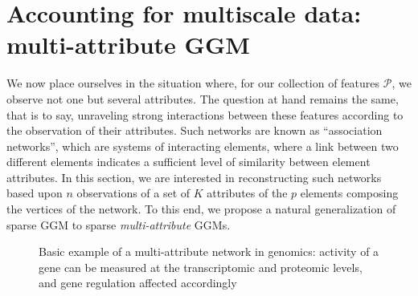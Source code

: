 \section{Accounting for multiscale data: multi-attribute GGM}
\label{sec:multiattribute_ggm}

We now place  ourselves in the situation where, for  our collection of
features $\mathcal{P}$, we observe not one but several attributes. The
question at hand  remains the same, that is to  say, unraveling strong
interactions between  these features  according to the  observation of
their   attributes.   Such   networks  are   known  as   ``association
networks'', which  are systems of  interacting elements, where  a link
between  two  different  elements  indicates  a  sufficient  level  of
similarity  between  element  attributes.   In this  section,  we  are
interested in reconstructing such networks based upon $n$ observations
of a set of $K$ attributes  of the $p$ elements composing the vertices
of the  network. To this end,  we propose a natural  generalization of
sparse GGM to sparse \emph{multi-attribute} GGMs.

\begin{figure}[htbp!]
  \centering
  \caption{Basic example of a multi-attribute network in genomics:
    activity  of a  gene  can  be measured  at  the transcriptomic  and
    proteomic levels, and gene regulation affected accordingly}
\label{fig:central_dogma}
\end{figure}

